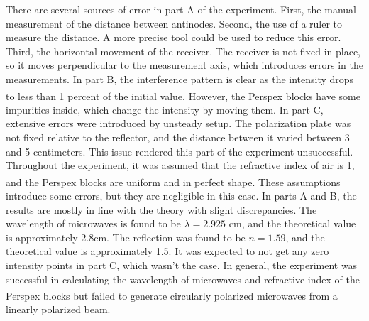 \documentclass[10pt]{article}
\begin{document}
There are several sources of error in part A of the experiment. First, the manual measurement of the distance between antinodes. Second, the use of a ruler to measure the distance. A more precise tool could be used to reduce this error. Third, the horizontal movement of the receiver. The receiver is not fixed in place, so it moves perpendicular to the measurement axis, which introduces errors in the measurements. In part B, the interference pattern is clear as the intensity drops to less than 1 percent of the initial value. However, the Perspex\textsuperscript{\textregistered} blocks have some impurities inside, which change the intensity by moving them. In part C, extensive errors were introduced by unsteady setup. The polarization plate was not fixed relative to the reflector, and the distance between it varied between 3 and 5 centimeters. This issue rendered this part of the experiment unsuccessful. Throughout the experiment, it was assumed that the refractive index of air is 1, and the Perspex\textsuperscript{\textregistered} blocks are uniform and in perfect shape. These assumptions introduce some errors, but they are negligible in this case. In parts A and B, the results are mostly in line with the theory with slight discrepancies. The wavelength of microwaves is found to be $\lambda = 2.925$ cm, and the theoretical value is approximately 2.8cm. The reflection was found to be $n = 1.59$, and the theoretical value is approximately 1.5. It was expected to not get any zero intensity points in part C, which wasn't the case. In general, the experiment was successful in calculating the wavelength of microwaves and refractive index of the Perspex\textsuperscript{\textregistered} blocks but failed to generate circularly polarized microwaves from a linearly polarized beam.

\printbibliography
\end{document}
